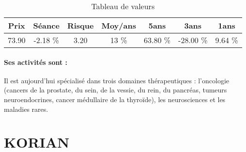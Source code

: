 \documentclass[11pt,a4paper]{report}%
\begin{document}
\begin{table}[H]
  \centering
    \begin{tabular}{|c|c|c|c|c|c|c|}
    \hline
    Prix & Séance & Risque  & Moy/ans & 5ans & 3ans & 1ans \\
    \hline
    73.90 &    -2.18 \%    & 3.20 & 13 \% & 63.80 \% & -28.00 \% & 9.64 \% \\
    \hline
    \end{tabular}%
        \label{tab:table_IPSEN}%
      \caption{Tableau de valeurs}
\end{table}%

\paragraph{Ses activités sont : } Il est aujourd'hui spécialisé dans trois domaines thérapeutiques : l’oncologie (cancers de la prostate, du sein, de la vessie, du rein, du pancréas, tumeurs neuroendocrines, cancer médullaire de la thyroïde), les neurosciences et les maladies rares. 
    
    \newpage

\section{KORIAN}
\end{document}
